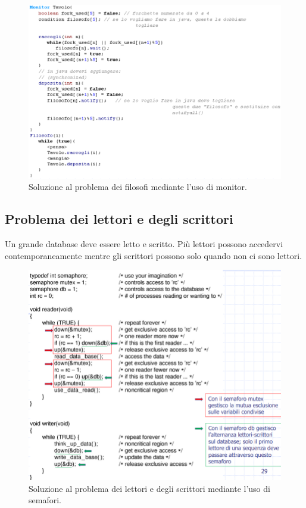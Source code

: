 \documentclass{article}
\begin{document}
\begin{figure}[H]
    \centering
    \includegraphics[scale=0.5]{filosofi-monitor.png}
    \caption{Soluzione al problema dei filosofi mediante l'uso di monitor.}
    \label{fig:filo-monitor}
\end{figure}

\subsection{Problema dei lettori e degli scrittori} Un grande database deve essere letto e scritto. Più lettori possono accedervi contemporaneamente mentre gli scrittori possono solo quando non ci sono lettori.

\begin{figure}[H]
    \centering
    \includegraphics[scale=0.5]{lettorescrittore.png}
    \caption{Soluzione al problema dei lettori e degli scrittori mediante l'uso di semafori.}
    \label{fig:filo-monitor}
\end{figure}
\end{document}
